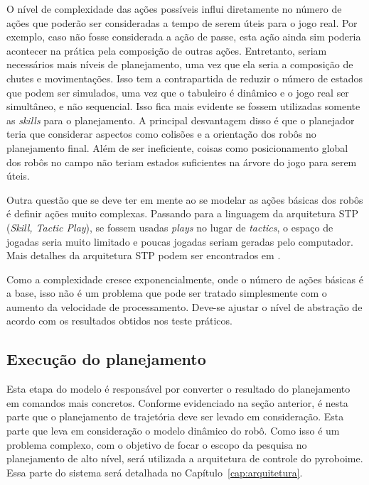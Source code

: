 O nível de complexidade das ações possíveis influi diretamente no número de
ações que poderão ser consideradas a tempo de serem úteis para o jogo real. Por
exemplo, caso não fosse considerada a ação de passe, esta ação ainda sim poderia
acontecer na prática pela composição de outras ações. Entretanto, seriam
necessários mais níveis de planejamento, uma vez que ela seria a composição de
chutes e movimentações. Isso tem a contrapartida de reduzir o número de estados
que podem ser simulados, uma vez que o tabuleiro é dinâmico e o jogo real ser
simultâneo, e não sequencial. Isso fica mais evidente se fossem utilizadas
somente as \textit{skills} para o planejamento. A principal desvantagem disso
é que o planejador teria que considerar aspectos como colisões e a orientação
dos robôs no planejamento final. Além de ser ineficiente, coisas como
posicionamento global dos robôs no campo não teriam estados suficientes na
árvore do jogo para serem úteis.

Outra questão que se deve ter em mente ao se modelar as ações básicas dos robôs
é definir ações muito complexas. Passando para a linguagem da arquitetura STP
(\textit{Skill, Tactic Play}), se fossem usadas \textit{plays} no lugar de
\textit{tactics}, o espaço de jogadas seria muito limitado e poucas jogadas
seriam geradas pelo computador. Mais detalhes da arquitetura STP podem ser
encontrados em \cite{browning2004stp}.

Como a complexidade cresce exponencialmente, onde o número de ações básicas é
a base, isso não é um problema que pode ser tratado simplesmente com o aumento
da velocidade de processamento. Deve-se ajustar o nível de abstração de acordo
com os resultados obtidos nos teste práticos.

\subsection{Execução do planejamento}

Esta etapa do modelo é responsável por converter o resultado do planejamento em
comandos mais concretos. Conforme evidenciado na seção anterior, é nesta parte
que o planejamento de trajetória deve ser levado em consideração. Esta parte que
leva em consideração o modelo dinâmico do robô.
Como isso é um problema complexo, com o objetivo de focar o escopo da pesquisa
no planejamento de alto nível, será utilizada a arquitetura de controle do
pyroboime. Essa parte do sistema será detalhada no Capítulo~\ref{cap:arquitetura}.

